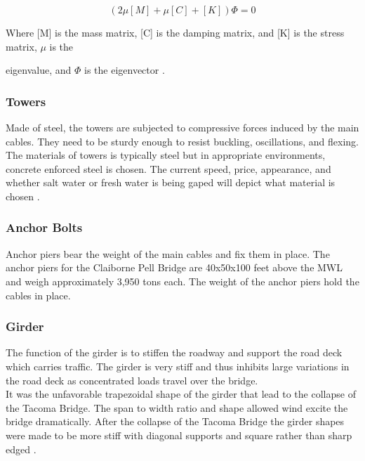 
\begin{equation}

( 2 \mu[M] + \mu[C] + [K]){\Phi} = 0

\label{eqn:Euler}

\end{equation}

Where [M] is the mass matrix, [C] is the damping matrix, and [K] is the stress matrix, $\mu$ is the 

eigenvalue, and $\Phi$ is the eigenvector \cite{manoj}. 

\subsubsection{Towers}

Made of steel, the towers are subjected to compressive forces induced by the main cables. They need to be sturdy enough to resist buckling, oscillations,
and flexing. The materials of towers is typically steel but in appropriate environments, concrete enforced steel is chosen. The current speed, price,
appearance, and whether salt water or fresh water is being gaped will depict what material is chosen \cite{manoj}. 


\subsubsection{Anchor Bolts}

Anchor piers bear the weight of the main cables and fix them in place. The anchor piers for the Claiborne Pell Bridge are 40x50x100 feet above the MWL and
weigh approximately 3,950 tons each. The weight of the anchor piers hold the cables in place. 

\subsubsection{Girder}

The function of the girder is to stiffen the roadway and support the road deck which carries traffic. The girder is very stiff and thus inhibits large
variations in the road deck as concentrated loads travel over the bridge.\\ 
\indent It was the unfavorable trapezoidal shape of the girder that lead to the collapse of the Tacoma Bridge. The span to width ratio and shape allowed
wind excite the bridge dramatically. After the collapse of the Tacoma Bridge the girder shapes were made to be more stiff with diagonal supports and
square rather than sharp edged \cite{manoj}. 

